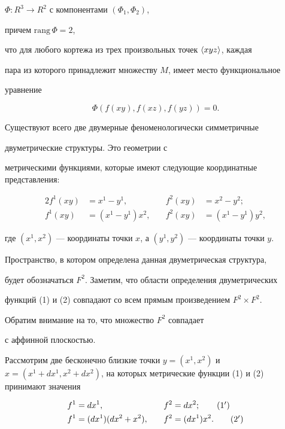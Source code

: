 $\varPhi:R^3 \to R^2$ с компонентами $(\varPhi_1,\varPhi_2)$,


причем $\mathrm{rang}\,\varPhi=2$,


что для любого кортежа из трех произвольных точек $\langle xyz\rangle$, каждая


пара из которого принадлежит множеству $M$, имеет место функциональное


уравнение


\begin{equation*}


\varPhi(f(xy),f(xz),f(yz))=0.


\end{equation*}





Существуют всего две двумерные феноменологически симметричные


двуметрические структуры. Это геометрии с


метрическими функциями, которые имеют следующие координатные представления:


\begin{alignat}{2}


f^1(xy)&=x^1 - y^1, &\quad f^2(xy)&=x^2 - y^2;\\


f^1(xy)&=(x^1 - y^1)x^2, &\quad f^2(xy)&=(x^1 - y^1)y^2,


\end{alignat}


где $(x^1,x^2)$ --- координаты точки $x$, а $(y^1,y^2)$ --- координаты точки $y$.


Пространство, в котором определена данная двуметрическая структура,


будет обозначаться $F^2$. Заметим, что области определения двуметрических


функций (1) и (2) совпадают со всем прямым произведением $F^2\times F^2$.


Обратим внимание на то, что множество $F^2$ совпадает


с аффинной плоскостью.





Рассмотрим две бесконечно близкие точки $y=(x^1,x^2)$ и $x=(x^1+dx^1,x^2+


dx^2)$, на которых метрические функции (1) и (2) принимают значения


\begin{alignat}{2}


f^1&=dx^1, &\quad f^2&=dx^2;\tag{1${}'$} \\


f^1&=(dx^1)(dx^2+x^2), &\quad f^2&=(dx^1)x^2.\tag{2${}'$}


\end{alignat}


